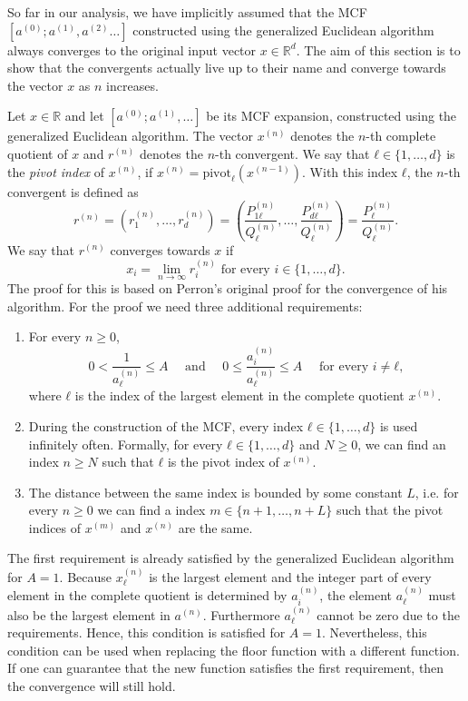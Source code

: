 So far in our analysis, we have implicitly assumed that the MCF $[a^{(0)}; a^{(1)}, a^{(2)} …]$
constructed using the generalized Euclidean algorithm always converges to the
original input vector $x ∈ ℝ^d$.
The aim of this section is to show that the convergents actually live up to
their name and converge towards the vector $x$ as $n$ increases.

Let $x ∈ ℝ$ and let $[a^{(0)}; a^{(1)}, …]$ be its MCF expansion,
constructed using the generalized Euclidean algorithm.
The vector $x^{(n)}$ denotes the $n$-th complete quotient of $x$
and $r^{(n)}$ denotes the $n$-th convergent.
We say that $ℓ ∈ \{1, …, d\}$ is the \emph{pivot index} of $x^{(n)}$,
if $x^{(n)} = \mathrm{pivot}_ℓ(x^{(n-1)})$.
With this index $ℓ$, the $n$-th convergent is defined as
\[
  r^{(n)}
  = (r_1^{(n)}, …, r_d^{(n)})
  = \left( \frac{P_{1ℓ}^{(n)}}{Q_ℓ^{(n)}}, \dots, \frac{P_{dℓ}^{(n)}}{Q_ℓ^{(n)}} \right)
  = \frac{P_ℓ^{(n)}}{Q_ℓ^{(n)}}.
\]
We say that $r^{(n)}$ converges towards $x$ if
\[
  x_i = \lim_{n → ∞} r_i^{(n)} \text{ for every } i ∈ \{1, …, d\}.
\]
The proof for this is based on Perron's original proof \cite{Perron07} for the
convergence of his algorithm.
For the proof we need three additional requirements:
\begin{enumerate}
  \item
    For every $n ≥ 0$,
    \[
      0 < \frac{1}{a_ℓ^{(n)}} ≤ A
      \quad \text{ and } \quad
      0 ≤ \frac{a_i^{(n)}}{a_ℓ^{(n)}} ≤ A \quad \text{ for every } i ≠ ℓ,
    \]
    where $ℓ$ is the index of the largest element in the complete quotient $x^{(n)}$.
  \item
    During the construction of the MCF,
    every index $ℓ ∈ \{1, …, d\}$ is used infinitely often.
    Formally, for every $ℓ ∈ \{1, …, d\}$ and $N ≥ 0$,
    we can find an index $n ≥ N$ such that $ℓ$ is the pivot index of $x^{(n)}$.
  \item
    The distance between the same index is bounded by some constant $L$,
    i.e. for every $n ≥ 0$ we can find a index $m ∈ \{n+1, …, n+L\}$ such that
    the pivot indices of $x^{(m)}$ and $x^{(n)}$ are the same.
\end{enumerate}

The first requirement is already satisfied by the generalized Euclidean algorithm for $A = 1$.
Because $x_ℓ^{(n)}$ is the largest element
and the integer part of every element in the complete quotient is determined by $a_i^{(n)}$,
the element $a_ℓ^{(n)}$ must also be the largest element in $a^{(n)}$.
Furthermore $a_ℓ^{(n)}$ cannot be zero due to the requirements.
Hence, this condition is satisfied for $A = 1$.
Nevertheless,
this condition can be used when replacing the floor function with a different function.
If one can guarantee that the new function satisfies the first requirement,
then the convergence will still hold.

